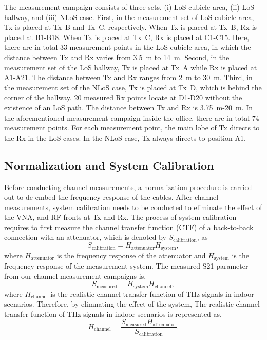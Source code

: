 \documentclass[journal,12pt,draftclsnofoot,onecolumn]{IEEEtran}
\begin{document}
\par The measurement campaign consists of three sets, (i) LoS cubicle area, (ii) LoS hallway, and (iii) NLoS case. First, in the measurement set of LoS cubicle area, Tx is placed at Tx~B and Tx~C, respectively. When Tx is placed at Tx~B, Rx is placed at B1-B18. When Tx is placed at Tx~C, Rx is placed at C1-C15. Here, there are in total 33 measurement points in the LoS cubicle area, in which the distance between Tx and Rx varies from 3.5~m to 14~m. Second, in the measurement set of the LoS hallway, Tx is placed at Tx~A while Rx is placed at A1-A21. The distance between Tx and Rx ranges from 2~m to 30~m. Third, in the measurement set of the NLoS case, Tx is placed at Tx~D, which is behind the corner of the hallway. 20 measured Rx points locate at D1-D20 without the existence of an LoS path. The distance between Tx and Rx is 3.75~m-20~m. In the aforementioned measurement campaign inside the office, there are in total 74 measurement points. For each measurement point, the main lobe of Tx directs to the Rx in the LoS cases. In the NLoS case, Tx always directs to position A1. 

\subsection{Normalization and System Calibration}
Before conducting channel measurements, a normalization procedure is carried out to de-embed the frequency response of the cables. After channel measurements, system calibration needs to be conducted to eliminate the effect of the VNA, and RF fronts at Tx and Rx. The process of system calibration requires to first measure the channel transfer function (CTF) of a back-to-back connection with an attenuator, which is denoted by $S_{\text{calibration}}$, as
\begin{equation}
    S_{\text{calibration}}=H_{\text{attenuator}}H_{\text{system}},
\end{equation}
where $H_{\text{attenuator}}$ is the frequency response of the attenuator and $H_{\text{system}}$ is the frequency response of the measurement system. The measured S21 parameter from our channel measurement campaigns is, 
\begin{equation}
    S_{\text{measured}}=H_{\text{system}}H_{\text{channel}},
\end{equation}
where $H_{\text{channel}}$ is the realistic channel transfer function of THz signals in indoor scenarios. Therefore, by elimnating the effect of the system, The realistic channel transfer function of THz signals in indoor scenarios is represented as, 
\begin{equation}
    H_{\text{channel}}=\frac{S_{\text{measured}}H_{\text{attenuator}}}{S_{\text{calibration}}}.
\end{equation}
\end{document}
